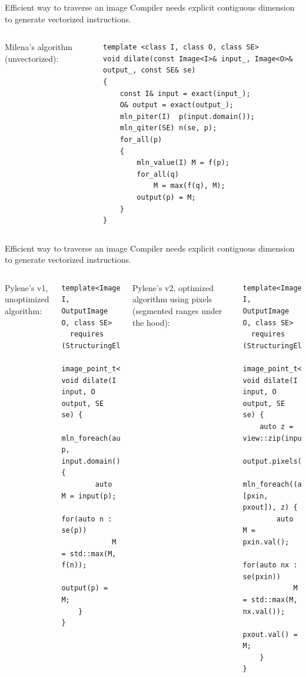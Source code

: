 \documentclass[12pt,aspectratio=169]{beamer}
\begin{document}
\begin{frame}[fragile]{Efficient way to traverse an image}
  Compiler needs explicit contiguous dimension to generate vectorized instructions.
  \begin{columns}[T,onlytextwidth]
    Milena's algorithm (unvectorized):
    \begin{verbatim}
template <class I, class O, class SE>
void dilate(const Image<I>& input_, Image<O>& output_, const SE& se)
{
    const I& input = exact(input_);
    O& output = exact(output_);
    mln_piter(I)  p(input.domain());
    mln_qiter(SE) n(se, p);
    for_all(p)
    {
        mln_value(I) M = f(p);
        for_all(q)
            M = max(f(q), M);
        output(p) = M;
    }
}
    \end{verbatim}

  \end{columns}
\end{frame}

\begin{frame}[fragile]{Efficient way to traverse an image}
  Compiler needs explicit contiguous dimension to generate vectorized instructions.
  \begin{columns}[T,onlytextwidth]
    Pylene's v1, unoptimized algorithm:
    \begin{verbatim}
template<Image I, OutputImage O, class SE>
  requires (StructuringElement<SE,
              image_point_t<I>>)
void dilate(I input, O output, SE se) {
    mln_foreach(auto p, input.domain()) {
        auto M = input(p);
        for(auto n : se(p))
            M = std::max(M, f(n));
        output(p) = M;
    }
}
    \end{verbatim}
    Pylene's v2, optimized algorithm using pixels (segmented ranges under the hood):
    \begin{verbatim}
template<Image I, OutputImage O, class SE>
  requires (StructuringElement<SE,
              image_point_t<I>>)
void dilate(I input, O output, SE se) {
    auto z = view::zip(input.pixels(),
                output.pixels());
    mln_foreach((auto [pxin, pxout]), z) {
        auto M = pxin.val();
        for(auto nx : se(pxin))
            M = std::max(M, nx.val());
        pxout.val() = M;
    }
}
    \end{verbatim}
  \end{columns}
\end{frame}
\end{document}
